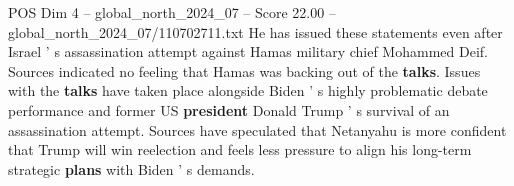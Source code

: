 \begin{textsample}{POS Dim 4 – global\_north\_2024\_07 – Score 22.00 – global\_north\_2024\_07/110702711.txt}
He has issued these statements even after Israel ' s assassination attempt against Hamas military chief Mohammed Deif.
Sources indicated no feeling that Hamas was backing out of the \textbf{talks}.
Issues with the \textbf{talks} have taken place alongside Biden ' s highly problematic debate performance and former US \textbf{president} Donald Trump ' s survival of an assassination attempt.
Sources have speculated that Netanyahu is more confident that Trump will win reelection and feels less pressure to align his long-term strategic \textbf{plans} with Biden ' s demands.

\end{textsample}
